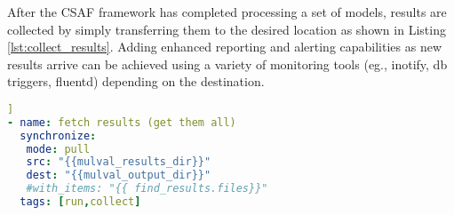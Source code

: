 After the CSAF framework has completed processing a set of models, results are collected by simply transferring them to the desired location as shown in Listing \ref{lst:collect_results}. Adding enhanced reporting and alerting capabilities as new results arrive can be achieved using a variety of monitoring tools (eg., inotify, db triggers, fluentd) depending on the destination.

\begin{lstlisting}[language=yaml, label={lst:collect_results}, caption={Collect Results},captionpos=b,  linewidth=.45\textwidth, xleftmargin=20pt]]
- name: fetch results (get them all)
  synchronize:
   mode: pull
   src: "{{mulval_results_dir}}"
   dest: "{{mulval_output_dir}}"
   #with_items: "{{ find_results.files}}"
  tags: [run,collect]
\end{lstlisting}
